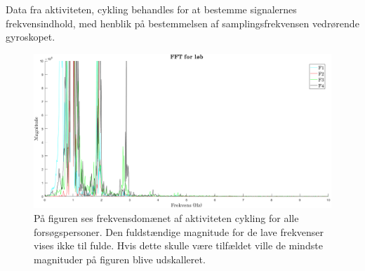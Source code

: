 Data fra aktiviteten, cykling behandles for at bestemme signalernes frekvensindhold, med henblik på bestemmelsen af samplingsfrekvensen vedrørende gyroskopet.
\begin{figure}[H]
	\centering
	\includegraphics[width=1\textwidth]{figures/qBilag/cykling_frekvens}
	\caption{På figuren ses frekvensdomænet af aktiviteten cykling for alle forsøgspersoner. Den fuldstændige magnitude for de lave frekvenser vises ikke til fulde. Hvis dette skulle være tilfældet ville de mindste magnituder på figuren blive udskalleret.}
	\label{fig:Ap_cyklingfrekvens}
\end{figure}\vspace{-.25cm}

